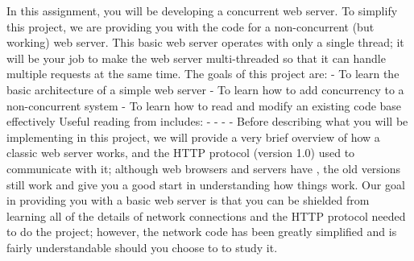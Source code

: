 \markdownRendererDocumentBegin
{}\markdownRendererInterblockSeparator
{}In this assignment, you will be developing a concurrent web server. To simplify this project, we are providing you with the code for a non-concurrent (but working) web server. This basic web server operates with only a single thread; it will be your job to make the web server multi-threaded so that it can handle multiple requests at the same time.\markdownRendererInterblockSeparator
{}The goals of this project are: - To learn the basic architecture of a simple web server - To learn how to add concurrency to a non-concurrent system - To learn how to read and modify an existing code base effectively\markdownRendererInterblockSeparator
{}Useful reading from  includes: -  -  -  - \markdownRendererInterblockSeparator
{}\markdownRendererInterblockSeparator
{}Before describing what you will be implementing in this project, we will provide a very brief overview of how a classic web server works, and the HTTP protocol (version 1.0) used to communicate with it; although web browsers and servers have , the old versions still work and give you a good start in understanding how things work. Our goal in providing you with a basic web server is that you can be shielded from learning all of the details of network connections and the HTTP protocol needed to do the project; however, the network code has been greatly simplified and is fairly understandable should you choose to to study it.\markdownRendererInterblockSeparator
